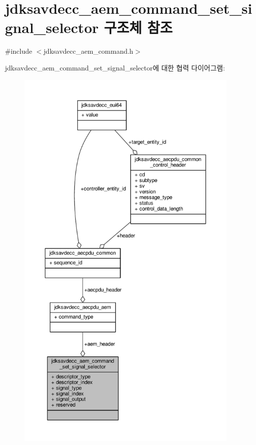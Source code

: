 \hypertarget{structjdksavdecc__aem__command__set__signal__selector}{}\section{jdksavdecc\+\_\+aem\+\_\+command\+\_\+set\+\_\+signal\+\_\+selector 구조체 참조}
\label{structjdksavdecc__aem__command__set__signal__selector}


{\ttfamily \#include $<$jdksavdecc\+\_\+aem\+\_\+command.\+h$>$}



jdksavdecc\+\_\+aem\+\_\+command\+\_\+set\+\_\+signal\+\_\+selector에 대한 협력 다이어그램\+:
\nopagebreak
\begin{figure}[H]
\begin{center}
\leavevmode
\includegraphics[height=550pt]{structjdksavdecc__aem__command__set__signal__selector__coll__graph}
\end{center}
\end{figure}
